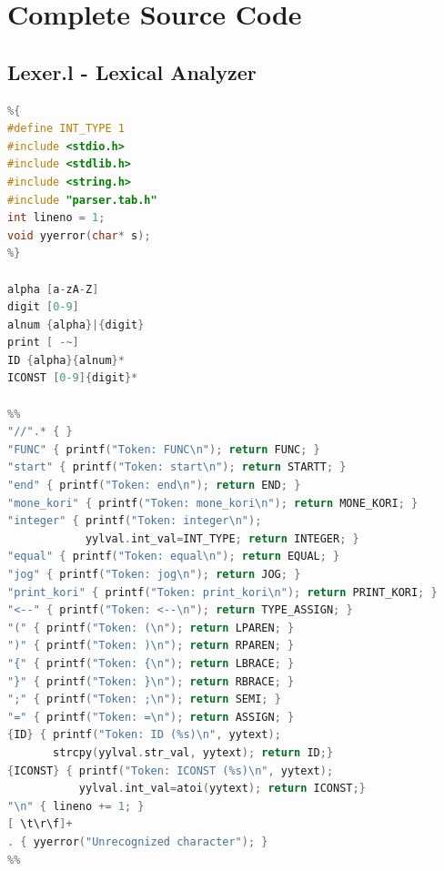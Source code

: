 \documentclass[12pt,a4paper]{article}
\begin{document}
\section{Complete Source Code}

\subsection{Lexer.l - Lexical Analyzer}
\begin{lstlisting}[language=C, caption={Complete Lexer Code}]
%option noyywrap
%{
#define INT_TYPE 1
#include <stdio.h>
#include <stdlib.h>
#include <string.h>
#include "parser.tab.h"
int lineno = 1;
void yyerror(char* s);
%}

alpha [a-zA-Z]
digit [0-9]
alnum {alpha}|{digit}
print [ -~]
ID {alpha}{alnum}*
ICONST [0-9]{digit}*

%%
"//".* { }
"FUNC" { printf("Token: FUNC\n"); return FUNC; }
"start" { printf("Token: start\n"); return STARTT; }
"end" { printf("Token: end\n"); return END; }
"mone_kori" { printf("Token: mone_kori\n"); return MONE_KORI; }
"integer" { printf("Token: integer\n"); 
            yylval.int_val=INT_TYPE; return INTEGER; }
"equal" { printf("Token: equal\n"); return EQUAL; }
"jog" { printf("Token: jog\n"); return JOG; }
"print_kori" { printf("Token: print_kori\n"); return PRINT_KORI; }
"<--" { printf("Token: <--\n"); return TYPE_ASSIGN; }
"(" { printf("Token: (\n"); return LPAREN; }
")" { printf("Token: )\n"); return RPAREN; }
"{" { printf("Token: {\n"); return LBRACE; }
"}" { printf("Token: }\n"); return RBRACE; }
";" { printf("Token: ;\n"); return SEMI; }
"=" { printf("Token: =\n"); return ASSIGN; }
{ID} { printf("Token: ID (%s)\n", yytext); 
       strcpy(yylval.str_val, yytext); return ID;}
{ICONST} { printf("Token: ICONST (%s)\n", yytext); 
           yylval.int_val=atoi(yytext); return ICONST;}
"\n" { lineno += 1; }
[ \t\r\f]+
. { yyerror("Unrecognized character"); }
%%
\end{lstlisting}
\end{document}
